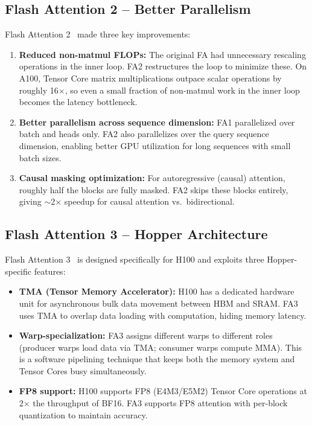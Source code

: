 \subsection{Flash Attention 2 -- Better Parallelism}
\label{flash-attention-2-better-parallelism}

Flash Attention 2~\cite{dao2023flashattention2} made three key improvements:

\begin{enumerate}
  \item \textbf{Reduced non-matmul FLOPs:} The original FA had unnecessary rescaling operations in the inner loop. FA2 restructures the loop to minimize these. On A100, Tensor Core matrix multiplications outpace scalar operations by roughly 16$\times$, so even a small fraction of non-matmul work in the inner loop becomes the latency bottleneck.
  \item \textbf{Better parallelism across sequence dimension:} FA1 parallelized over batch and heads only. FA2 also parallelizes over the query sequence dimension, enabling better GPU utilization for long sequences with small batch sizes.
  \item \textbf{Causal masking optimization:} For autoregressive (causal) attention, roughly half the blocks are fully masked. FA2 skips these blocks entirely, giving $\sim$2$\times$ speedup for causal attention vs.~bidirectional.
\end{enumerate}

\subsection{Flash Attention 3 -- Hopper Architecture}
\label{flash-attention-3-hopper-architecture}

Flash Attention 3~\cite{shah2024flashattention3} is designed specifically for H100 and exploits three Hopper-specific features:

\begin{itemize}
  \item \textbf{TMA (Tensor Memory Accelerator):} H100 has a dedicated hardware unit for asynchronous bulk data movement between HBM and SRAM. FA3 uses TMA to overlap data loading with computation, hiding memory latency.
  \item \textbf{Warp-specialization:} FA3 assigns different warps to different roles (producer warps load data via TMA; consumer warps compute MMA). This is a software pipelining technique that keeps both the memory system and Tensor Cores busy simultaneously.
  \item \textbf{FP8 support:} H100 supports FP8 (E4M3/E5M2) Tensor Core operations at 2$\times$ the throughput of BF16. FA3 supports FP8 attention with per-block quantization to maintain accuracy.
\end{itemize}

